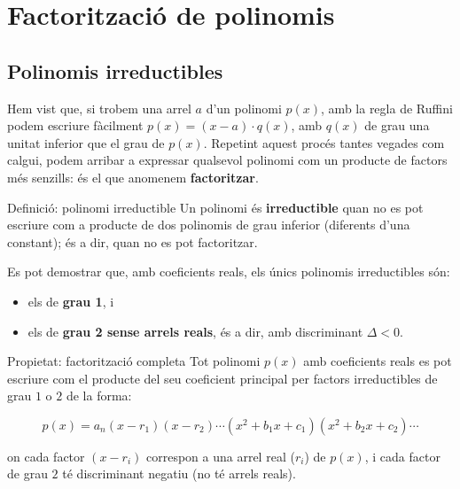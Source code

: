 \section{Factorització de polinomis}

\subsection{Polinomis irreductibles}

Hem vist que, si trobem una arrel $a$ d'un polinomi $p(x)$, amb la regla de Ruffini podem escriure fàcilment $p(x)=(x-a)\cdot q(x)$, amb $q(x)$ de grau una unitat inferior que el grau de $p(x)$. Repetint aquest procés tantes vegades com calgui, podem arribar a expressar qualsevol polinomi com un producte de factors més senzills: és el que anomenem \textbf{factoritzar}.

\begin{definicio}{Definició: polinomi irreductible}
Un polinomi és \textbf{irreductible} quan no es pot escriure com a producte de dos polinomis de grau inferior (diferents d'una constant); és a dir, quan no es pot factoritzar.

Es pot demostrar que, amb coeficients reals, els únics polinomis irreductibles són:

\begin{itemize}
\item els de \textbf{grau 1}, i
\item els de \textbf{grau 2 sense arrels reals}, és a dir, amb discriminant $\Delta<0$.
\end{itemize}
\end{definicio}

\begin{propietat}{Propietat: factorització completa}
Tot polinomi $p(x)$ amb coeficients reals es pot escriure com el producte del seu coeficient principal per factors irreductibles de grau $1$ o $2$ de la forma:

\[
p(x) = a_n(x-r_1)(x-r_2)\cdots(x^2+b_1x+c_1)(x^2+b_2x+c_2)\cdots
\]

on cada factor $(x-r_i)$ correspon a una arrel real ($r_i$) de $p(x)$, i cada factor de grau $2$ té discriminant negatiu (no té arrels reals).
\end{propietat}

